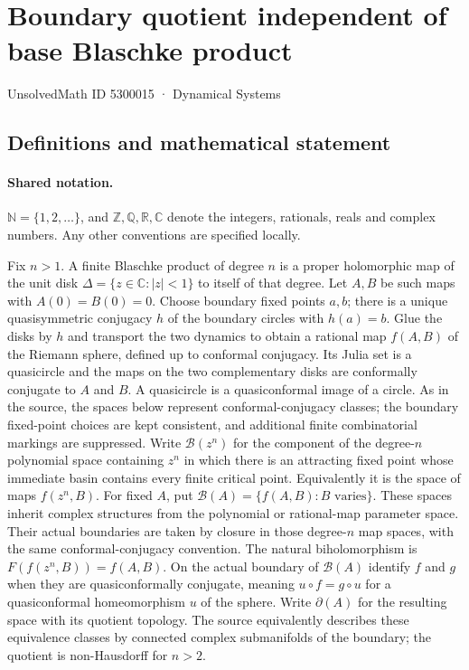 \documentclass[11pt]{article}
\begin{document}
\setcounter{section}{5300014}
\section{Boundary quotient independent of base Blaschke product}\label{5300015}
{\small\sffamily UnsolvedMath ID 5300015 · Dynamical Systems}
\subsection{Definitions and mathematical statement}

\paragraph{Shared notation.}$\mathbb N=\{1,2,\ldots\}$, and $\mathbb Z,\mathbb Q,\mathbb R,\mathbb C$ denote the integers, rationals, reals and complex numbers. Any other conventions are specified locally.


Fix $n>1$. A finite Blaschke product of degree $n$ is a proper holomorphic map of the unit disk $\Delta=\{z\in\mathbb C:|z|<1\}$ to itself of that degree. Let $A,B$ be such maps with $A(0)=B(0)=0$. Choose boundary fixed points $a,b$; there is a unique quasisymmetric conjugacy $h$ of the boundary circles with $h(a)=b$. Glue the disks by $h$ and transport the two dynamics to obtain a rational map $f(A,B)$ of the Riemann sphere, defined up to conformal conjugacy. Its Julia set is a quasicircle and the maps on the two complementary disks are conformally conjugate to $A$ and $B$. A quasicircle is a quasiconformal image of a circle. As in the source, the spaces below represent conformal-conjugacy classes; the boundary fixed-point choices are kept consistent, and additional finite combinatorial markings are suppressed.
Write $\mathcal B(z^n)$ for the component of the degree-$n$ polynomial space containing $z^n$ in which there is an attracting fixed point whose immediate basin contains every finite critical point. Equivalently it is the space of maps $f(z^n,B)$. For fixed $A$, put $\mathcal B(A)=\{f(A,B):B\text{ varies}\}$. These spaces inherit complex structures from the polynomial or rational-map parameter space. Their actual boundaries are taken by closure in those degree-$n$ map spaces, with the same conformal-conjugacy convention. The natural biholomorphism is $F(f(z^n,B))=f(A,B)$.
On the actual boundary of $\mathcal B(A)$ identify $f$ and $g$ when they are quasiconformally conjugate, meaning $u\circ f=g\circ u$ for a quasiconformal homeomorphism $u$ of the sphere. Write $\partial(A)$ for the resulting space with its quotient topology. The source equivalently describes these equivalence classes by connected complex submanifolds of the boundary; the quotient is non-Hausdorff for $n>2$.
\end{document}
